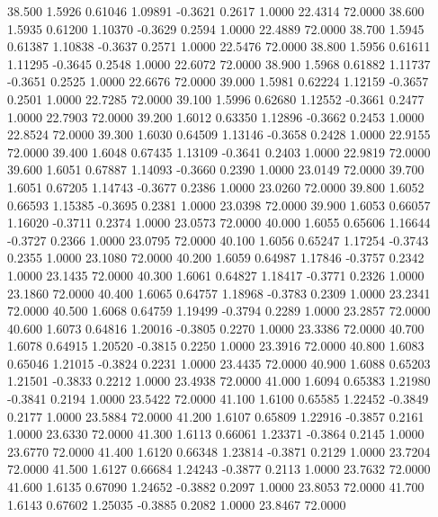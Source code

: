   38.500   1.5926   0.61046   1.09891  -0.3621   0.2617   1.0000  22.4314  72.0000
  38.600   1.5935   0.61200   1.10370  -0.3629   0.2594   1.0000  22.4889  72.0000
  38.700   1.5945   0.61387   1.10838  -0.3637   0.2571   1.0000  22.5476  72.0000
  38.800   1.5956   0.61611   1.11295  -0.3645   0.2548   1.0000  22.6072  72.0000
  38.900   1.5968   0.61882   1.11737  -0.3651   0.2525   1.0000  22.6676  72.0000
  39.000   1.5981   0.62224   1.12159  -0.3657   0.2501   1.0000  22.7285  72.0000
  39.100   1.5996   0.62680   1.12552  -0.3661   0.2477   1.0000  22.7903  72.0000
  39.200   1.6012   0.63350   1.12896  -0.3662   0.2453   1.0000  22.8524  72.0000
  39.300   1.6030   0.64509   1.13146  -0.3658   0.2428   1.0000  22.9155  72.0000
  39.400   1.6048   0.67435   1.13109  -0.3641   0.2403   1.0000  22.9819  72.0000
  39.600   1.6051   0.67887   1.14093  -0.3660   0.2390   1.0000  23.0149  72.0000
  39.700   1.6051   0.67205   1.14743  -0.3677   0.2386   1.0000  23.0260  72.0000
  39.800   1.6052   0.66593   1.15385  -0.3695   0.2381   1.0000  23.0398  72.0000
  39.900   1.6053   0.66057   1.16020  -0.3711   0.2374   1.0000  23.0573  72.0000
  40.000   1.6055   0.65606   1.16644  -0.3727   0.2366   1.0000  23.0795  72.0000
  40.100   1.6056   0.65247   1.17254  -0.3743   0.2355   1.0000  23.1080  72.0000
  40.200   1.6059   0.64987   1.17846  -0.3757   0.2342   1.0000  23.1435  72.0000
  40.300   1.6061   0.64827   1.18417  -0.3771   0.2326   1.0000  23.1860  72.0000
  40.400   1.6065   0.64757   1.18968  -0.3783   0.2309   1.0000  23.2341  72.0000
  40.500   1.6068   0.64759   1.19499  -0.3794   0.2289   1.0000  23.2857  72.0000
  40.600   1.6073   0.64816   1.20016  -0.3805   0.2270   1.0000  23.3386  72.0000
  40.700   1.6078   0.64915   1.20520  -0.3815   0.2250   1.0000  23.3916  72.0000
  40.800   1.6083   0.65046   1.21015  -0.3824   0.2231   1.0000  23.4435  72.0000
  40.900   1.6088   0.65203   1.21501  -0.3833   0.2212   1.0000  23.4938  72.0000
  41.000   1.6094   0.65383   1.21980  -0.3841   0.2194   1.0000  23.5422  72.0000
  41.100   1.6100   0.65585   1.22452  -0.3849   0.2177   1.0000  23.5884  72.0000
  41.200   1.6107   0.65809   1.22916  -0.3857   0.2161   1.0000  23.6330  72.0000
  41.300   1.6113   0.66061   1.23371  -0.3864   0.2145   1.0000  23.6770  72.0000
  41.400   1.6120   0.66348   1.23814  -0.3871   0.2129   1.0000  23.7204  72.0000
  41.500   1.6127   0.66684   1.24243  -0.3877   0.2113   1.0000  23.7632  72.0000
  41.600   1.6135   0.67090   1.24652  -0.3882   0.2097   1.0000  23.8053  72.0000
  41.700   1.6143   0.67602   1.25035  -0.3885   0.2082   1.0000  23.8467  72.0000
